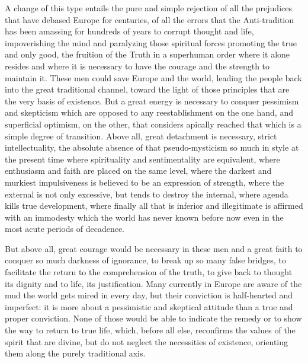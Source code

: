 A change of this type entails the pure and simple rejection of all the prejudices that have debased Europe for centuries, of all the errors that the Anti-tradition has been amassing for hundreds of years to corrupt thought and life, impoverishing the mind and paralyzing those spiritual forces promoting the true and only good, the fruition of the Truth in a superhuman order where it alone resides and where it is necessary to have the courage and the strength to maintain it. These men could save Europe and the world, leading the people back into the great traditional channel, toward the light of those principles that are the very basis of existence. But a great energy is necessary to conquer pessimism and skepticism which are opposed to any reestablishment on the one hand, and superficial optimism, on the other, that considers apically reached that which is a simple degree of transition. Above all, great detachment is necessary, strict intellectuality, the absolute absence of that pseudo-mysticism so much in style at the present time where spirituality and sentimentality are equivalent, where enthusiasm and faith are placed on the same level, where the darkest and murkiest impulsiveness is believed to be an expression of strength, where the external is not only excessive, but tends to destroy the internal, where agenda kills true development, where finally all that is inferior and illegitimate is affirmed with an immodesty which the world has never known before now even in the most acute periods of decadence.

But above all, great courage would be necessary in these men and a great faith to conquer so much darkness of ignorance, to break up so many false bridges, to facilitate the return to the comprehension of the truth, to give back to thought its dignity and to life, its justification. Many currently in Europe are aware of the mud the world gets mired in every day, but their conviction is half-hearted and imperfect: it is more about a pessimistic and skeptical attitude than a true and proper conviction. None of those would be able to indicate the remedy or to show the way to return to true life, which, before all else, reconfirms the values of the spirit that are divine, but do not neglect the necessities of existence, orienting them along the purely traditional axis.

